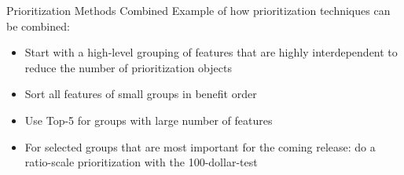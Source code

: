 \begin{Slide}{Prioritization Methods Combined}
Example of how prioritization techniques can be combined:
\begin{itemize}
\item Start with a high-level grouping of features that are highly interdependent to reduce the number of prioritization objects
\item Sort all features of small groups in benefit order
\item Use Top-5 for groups with large number of features
\item For selected groups that are most important for the coming release:
  do a ratio-scale prioritization with the 100-dollar-test

\end{itemize}
\end{Slide}